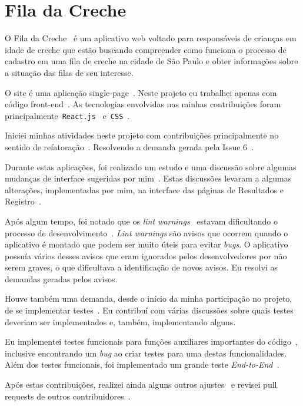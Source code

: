 \documentclass[a4paper, 11pt]{article} %
\begin{document}

\section*{Fila da Creche}
O Fila da Creche~\cite{Fila} é um aplicativo web voltado para responsáveis de crianças em idade de creche que estão buscando compreender como funciona o processo de cadastro em uma fila de creche na cidade de São Paulo e obter informações sobre a situação das filas de seu interesse.

O site é uma aplicação single-page~\cite{SinglePage}. Neste projeto eu trabalhei apenas com código front-end~\cite{FrontEnd}. As tecnologias envolvidas nas minhas contribuições foram principalmente~\texttt{React.js}~\cite{React} e~\texttt{CSS}~\cite{CSS}.

Iniciei minhas atividades neste projeto com contribuições principalmente no sentido de refatoração~\cite{C0}. Resolvendo a demanda gerada pela Issue 6~\cite{I6}.

Durante estas aplicações, foi realizado um estudo e uma discussão sobre algumas mudanças de interface sugeridas por mim~\cite{I27,I35}. Estas discussões levaram a algumas alterações, implementadas por mim, na interface das páginas de Resultados e Registro~\cite{I34}.

Após algum tempo, foi notado que os \textit{lint warnings}~\cite{Lint} estavam dificultando o processo de desenvolvimento~\cite{I45}. \textit{Lint warnings} são avisos que ocorrem quando o aplicativo é montado que podem ser muito úteis para evitar \textit{bugs}. O aplicativo possuía vários desses avisos que eram ignorados pelos desenvolvedores por não serem graves, o que dificultava a identificação de novos avisos. Eu resolvi as demandas geradas pelos avisos.

Houve também uma demanda, desde o início da minha participação no projeto, de se implementar testes~\cite{I8,I9}. Eu contribuí com várias discussões sobre quais testes deveriam ser implementados e, também, implementando alguns.

Eu implementei testes funcionais para funções auxiliares importantes do código~\cite{P40,P41,P42}, inclusive encontrando um \textit{bug} ao criar testes para uma destas funcionalidades. Além dos testes funcionais, foi implementado um grande teste \textit{End-to-End}~\cite{P43}.

Após estas contribuições, realizei ainda alguns outros ajustes~\cite{P44,P49,P51} e revisei pull requests de outros contribuidores~\cite{P52,P56,P57,P53}.
\end{document}
